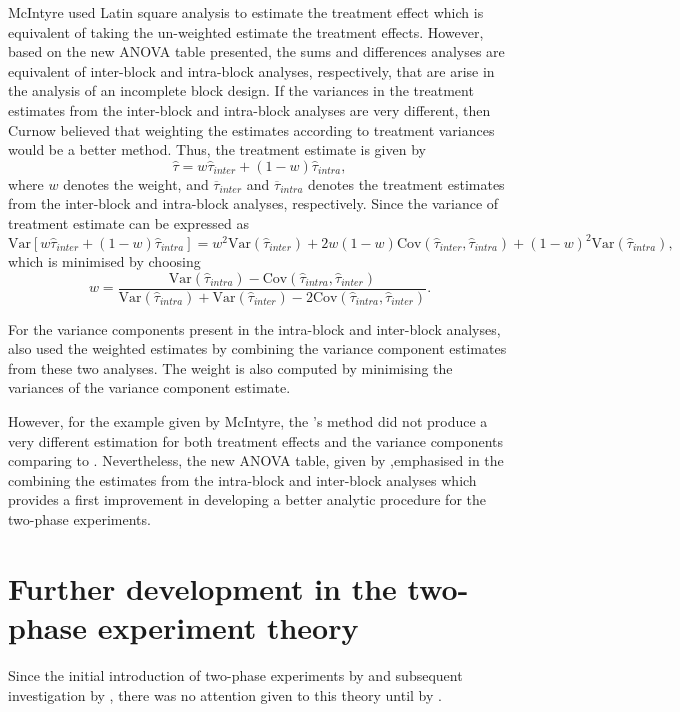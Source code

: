 \documentclass[11pt,a4paper]{article}
\begin{document}
McIntyre used Latin square analysis to estimate the treatment effect which is equivalent of taking the un-weighted estimate the treatment effects. However, based on the new ANOVA table presented, the sums and differences analyses are equivalent of inter-block and intra-block analyses, respectively, that are arise in the analysis of an incomplete block design. If the variances in the treatment estimates from the inter-block and intra-block analyses are very different, then Curnow believed that weighting the estimates according to treatment variances would be a better method. Thus, the treatment estimate is given by 
\begin{equation}\label{eq:weightTrtEst}
\hat{\tau} = w \hat{\tau}_{inter} + (1 - w)\hat{\tau}_{intra} ,
\end{equation}
where $w$ denotes the weight, and $\overline{\tau}_{inter}$ and $\overline{\tau}_{intra}$ denotes the treatment estimates from the inter-block and intra-block analyses, respectively. Since the variance of treatment estimate can be expressed as 
\[
\mathrm{Var}[w  \hat{\tau}_{inter} + (1 - w)\hat{\tau}_{intra}] = w^2 \mathrm{Var}(\hat{\tau}_{inter}) + 2 w (1-w)  \mathrm{Cov}(\hat{\tau}_{inter}, \hat{\tau}_{intra}) + (1-w)^2 \mathrm{Var}(\hat{\tau}_{intra}), 
\]
which is minimised by choosing 
\begin{equation}
w = \frac{\mathrm{Var}(\hat{\tau}_{intra}) - \mathrm{Cov}(\hat{\tau}_{intra}, \hat{\tau}_{inter})}{\mathrm{Var}(\hat{\tau}_{intra}) + \mathrm{Var}(\hat{\tau}_{inter}) - 2\mathrm{Cov}(\hat{\tau}_{intra}, \hat{\tau}_{inter})}.
\end{equation}

For the variance components present in the intra-block and inter-block analyses, \cite{Curnow1959} also used the weighted estimates by combining the variance component estimates from these two analyses. The weight is also computed by minimising the variances of the variance component estimate.

However, for the example given by McIntyre, the \citeauthor{Curnow1959}'s method did not produce a very different estimation for both treatment effects and the variance components comparing to \cite{McIntyre1955}. Nevertheless, the new ANOVA table, given by  \cite{Curnow1959},emphasised in the combining the estimates from the intra-block and inter-block analyses which provides a first improvement in developing a better analytic procedure for the two-phase experiments. 


\section{Further development in the two-phase experiment theory}
Since the initial introduction of two-phase experiments by \citeauthor{McIntyre1955} and subsequent investigation by \citeauthor{Curnow1959}, there was no attention given to this theory until by \cite{Brien1983}. 
\end{document}

